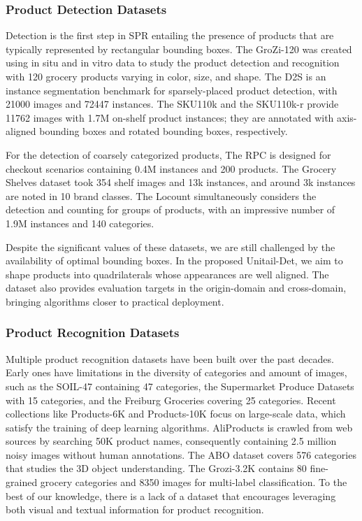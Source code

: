 \documentclass[runningheads]{llncs}
\begin{document}
\subsubsection{Product Detection Datasets}
Detection is the first step in SPR entailing the presence of products that are typically represented by rectangular bounding boxes. The GroZi-120 \cite{Grozi-120} was created using in situ and in vitro data to study the product detection and recognition with 120 grocery products varying in color, size, and shape. The D2S \cite{D2S2018} is an instance segmentation benchmark for sparsely-placed product detection, with 21000 images and 72447 instances. The SKU110k\cite{SKU110k} and the SKU110k-r\cite{SKU110k-r} provide 11762 images with 1.7M on-shelf product instances; they are annotated with axis-aligned bounding boxes and rotated bounding boxes, respectively. 

For the detection of coarsely categorized products, The RPC \cite{rpc} is designed for checkout scenarios containing 0.4M instances and 200 products. The Grocery Shelves dataset \cite{Grocery_shelves} took 354 shelf images and 13k instances, and around 3k instances are noted in 10 brand classes. The Locount \cite{locount} simultaneously considers the detection and counting for groups of products, with an impressive number of 1.9M instances and 140 categories.

Despite the significant values of these datasets, we are still challenged by the availability of optimal bounding boxes. In the proposed Unitail-Det, we aim to shape products into quadrilaterals whose appearances are well aligned. The dataset also provides evaluation targets in the origin-domain and cross-domain, bringing algorithms closer to practical deployment. 

\subsubsection{Product Recognition Datasets}
Multiple product recognition datasets have been built over the past decades. Early ones have limitations in the diversity of categories and amount of images, such as the SOIL-47 \cite{SOIL-47} containing 47 categories, the Supermarket Produce Datasets  \cite{Supermarket2010} with 15 categories, and the Freiburg Groceries \cite{Freiburg_Groceries} covering 25 categories. Recent collections like Products-6K\cite{products-6k} and Products-10K\cite{products-10k} focus on large-scale data, which satisfy the training of deep learning algorithms. 
AliProducts\cite{AliProduct} is crawled from web sources by searching 50K product names, consequently containing 2.5 million noisy images without human annotations. The ABO\cite{ABO_dataset} dataset covers 576 categories that studies the 3D object understanding. The Grozi-3.2K \cite{Grozi-3.2k} contains 80 fine-grained grocery categories and 8350 images for multi-label classification.
To the best of our knowledge, there is a lack of a dataset that encourages leveraging both visual and textual information for product recognition. 
\end{document}
